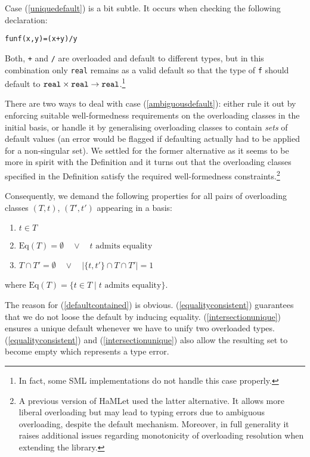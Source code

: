 \documentclass[twoside,titlepage]{article}
\begin{document}
Case (\ref{uniquedefault}) is a bit subtle. It occurs when checking the following declaration:

\begin{quoting}
\begin{alltt}
fun f(x,y) = (x + y)/y
\end{alltt}
\end{quoting}

Both, {\tt +} and {\tt /} are overloaded and default to different types, but in this combination only {\tt real} remains as a valid default so that the type of {\tt f} should default to ${\tt real}\times{\tt real}\to{\tt real}$.\footnote{In fact, some SML implementations do not handle this case properly.}

There are two ways to deal with case (\ref{ambiguousdefault}): either rule it out by enforcing suitable well-formedness requirements on the overloading classes in the initial basis, or handle it by generalising overloading classes to contain {\em sets} of default values (an error would be flagged if defaulting actually had to be applied for a non-singular set). We settled for the former alternative as it seems to be more in spirit with the Definition and it turns out that the overloading classes specified in the Definition satisfy the required well-formedness constraints.\footnote{A previous version of HaMLet used the latter alternative. It allows more liberal overloading but may lead to typing errors due to ambiguous overloading, despite the default mechanism. Moreover, in full generality it raises additional issues regarding monotonicity of overloading resolution when extending the library.}

Consequently, we demand the following properties for all pairs of overloading classes $(T,t)$, $(T',t')$ appearing in a basis:

\begin{enumerate}[nolistsep]
\item\label{defaultcontained} $t \in T$
\item\label{equalityconsistent} $\mbox{Eq}(T) = \emptyset \quad\vee\quad \mbox{$t$ admits equality}$
\item\label{intersectionunique} $T \cap T' = \emptyset \quad\vee\quad |\{t,t'\} \cap T \cap T'| = 1$
\end{enumerate}

where $\mbox{Eq}(T) = \{ t \in T \;|\; \mbox{$t$ admits equality} \}$.

The reason for (\ref{defaultcontained}) is obvious. (\ref{equalityconsistent}) guarantees that we do not loose the default by inducing equality. (\ref{intersectionunique}) ensures a unique default whenever we have to unify two overloaded types. (\ref{equalityconsistent}) and (\ref{intersectionunique}) also allow the resulting set to become empty which represents a type error.
\end{document}
